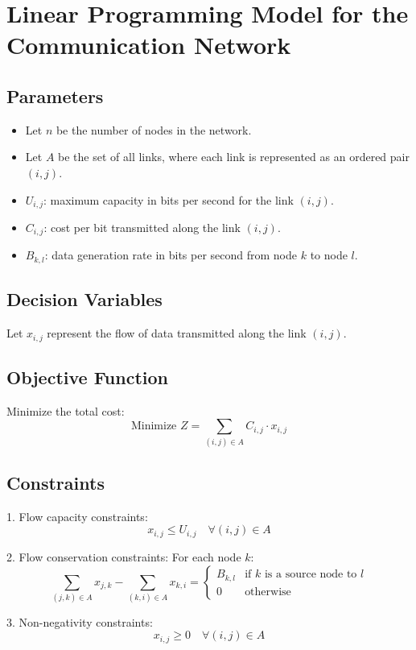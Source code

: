 \documentclass{article}
\begin{document}
\section*{Linear Programming Model for the Communication Network}

\subsection*{Parameters}
\begin{itemize}
    \item Let \( n \) be the number of nodes in the network.
    \item Let \( A \) be the set of all links, where each link is represented as an ordered pair \( (i, j) \).
    \item \( U_{i,j} \): maximum capacity in bits per second for the link \( (i, j) \).
    \item \( C_{i,j} \): cost per bit transmitted along the link \( (i, j) \).
    \item \( B_{k,l} \): data generation rate in bits per second from node \( k \) to node \( l \).
\end{itemize}

\subsection*{Decision Variables}
Let \( x_{i,j} \) represent the flow of data transmitted along the link \( (i, j) \).

\subsection*{Objective Function}
Minimize the total cost:
\[
\text{Minimize } Z = \sum_{(i,j) \in A} C_{i,j} \cdot x_{i,j}
\]

\subsection*{Constraints}
1. Flow capacity constraints:
\[
x_{i,j} \leq U_{i,j} \quad \forall (i,j) \in A
\]

2. Flow conservation constraints:
For each node \( k \):
\[
\sum_{(j,k) \in A} x_{j,k} - \sum_{(k,i) \in A} x_{k,i} = 
\begin{cases} 
B_{k,l} & \text{if } k \text{ is a source node to } l \\ 
0 & \text{otherwise} 
\end{cases}
\]

3. Non-negativity constraints:
\[
x_{i,j} \geq 0 \quad \forall (i,j) \in A
\]
\end{document}
